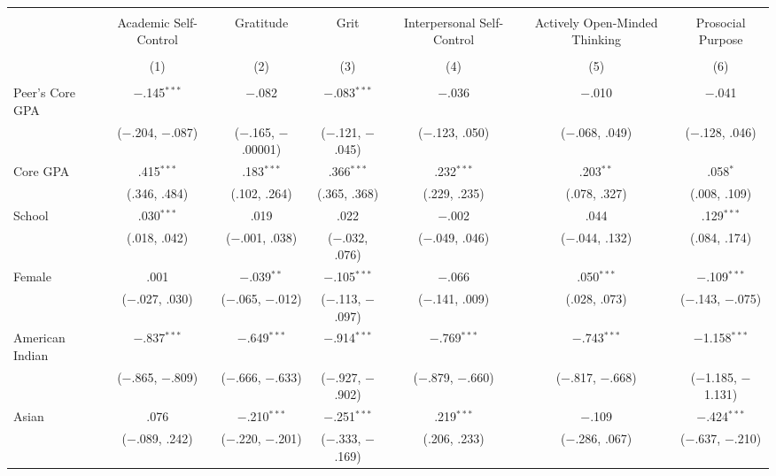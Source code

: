
\begin{table}[!htbp] \centering 
  \caption{} 
  \label{} 
\footnotesize 
\begin{tabular}{@{\extracolsep{5pt}}lcccccc} 
\\[-1.8ex]\hline \\[-1.8ex] 
 & Academic Self-Control & Gratitude & Grit & Interpersonal Self-Control & Actively Open-Minded Thinking & Prosocial Purpose \\ 
\\[-1.8ex] & (1) & (2) & (3) & (4) & (5) & (6)\\ 
\hline \\[-1.8ex] 
 Peer's Core GPA & $-$.145$^{***}$ & $-$.082 & $-$.083$^{***}$ & $-$.036 & $-$.010 & $-$.041 \\ 
  & ($-$.204, $-$.087) & ($-$.165, $-$.00001) & ($-$.121, $-$.045) & ($-$.123, .050) & ($-$.068, .049) & ($-$.128, .046) \\ 
  Core GPA & .415$^{***}$ & .183$^{***}$ & .366$^{***}$ & .232$^{***}$ & .203$^{**}$ & .058$^{*}$ \\ 
  & (.346, .484) & (.102, .264) & (.365, .368) & (.229, .235) & (.078, .327) & (.008, .109) \\ 
  School & .030$^{***}$ & .019 & .022 & $-$.002 & .044 & .129$^{***}$ \\ 
  & (.018, .042) & ($-$.001, .038) & ($-$.032, .076) & ($-$.049, .046) & ($-$.044, .132) & (.084, .174) \\ 
  Female & .001 & $-$.039$^{**}$ & $-$.105$^{***}$ & $-$.066 & .050$^{***}$ & $-$.109$^{***}$ \\ 
  & ($-$.027, .030) & ($-$.065, $-$.012) & ($-$.113, $-$.097) & ($-$.141, .009) & (.028, .073) & ($-$.143, $-$.075) \\ 
  American Indian & $-$.837$^{***}$ & $-$.649$^{***}$ & $-$.914$^{***}$ & $-$.769$^{***}$ & $-$.743$^{***}$ & $-$1.158$^{***}$ \\ 
  & ($-$.865, $-$.809) & ($-$.666, $-$.633) & ($-$.927, $-$.902) & ($-$.879, $-$.660) & ($-$.817, $-$.668) & ($-$1.185, $-$1.131) \\ 
  Asian & .076 & $-$.210$^{***}$ & $-$.251$^{***}$ & .219$^{***}$ & $-$.109 & $-$.424$^{***}$ \\ 
  & ($-$.089, .242) & ($-$.220, $-$.201) & ($-$.333, $-$.169) & (.206, .233) & ($-$.286, .067) & ($-$.637, $-$.210) \\ 

\end{tabular}
\end{table}
